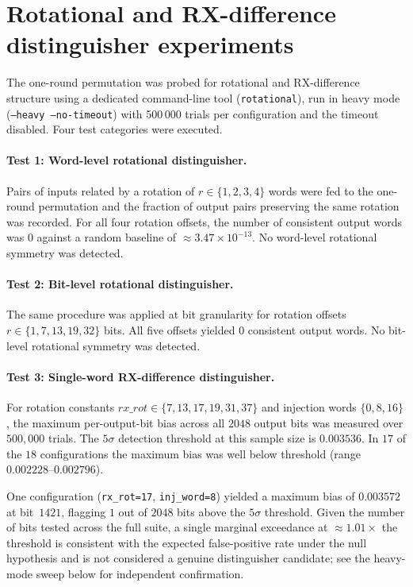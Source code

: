 \documentclass[11pt,a4paper]{article}
\begin{document}
\section{Rotational and RX-difference distinguisher experiments}
\label{sec:rotational}

The one-round permutation was probed for rotational and RX-difference structure
using a dedicated command-line tool (\texttt{rotational}), run in heavy mode
(\texttt{--heavy --no-timeout}) with 500\,000 trials per configuration and the
timeout disabled.  Four test categories were executed.

\paragraph{Test 1: Word-level rotational distinguisher.}
Pairs of inputs related by a rotation of $r \in \{1,2,3,4\}$ words were fed to
the one-round permutation and the fraction of output pairs preserving the same
rotation was recorded.  For all four rotation offsets, the number of consistent
output words was $0$ against a random baseline of ${\approx}3.47\times10^{-13}$.
No word-level rotational symmetry was detected.

\paragraph{Test 2: Bit-level rotational distinguisher.}
The same procedure was applied at bit granularity for rotation offsets
$r \in \{1, 7, 13, 19, 32\}$ bits.  All five offsets yielded $0$ consistent
output words.  No bit-level rotational symmetry was detected.

\paragraph{Test 3: Single-word RX-difference distinguisher.}
For rotation constants $\mathit{rx\_rot} \in \{7, 13, 17, 19, 31, 37\}$ and
injection words $\{0, 8, 16\}$, the maximum per-output-bit bias across all $2048$
output bits was measured over $500{,}000$ trials.  The $5\sigma$ detection
threshold at this sample size is $0.003536$.  In $17$ of the $18$ configurations
the maximum bias was well below threshold (range $0.002228$--$0.002796$).

One configuration (\texttt{rx\_rot=17}, \texttt{inj\_word=8}) yielded a maximum
bias of $0.003572$ at bit~$1421$, flagging $1$ out of $2048$ bits above the
$5\sigma$ threshold.  Given the number of bits tested across the full suite, a
single marginal exceedance at ${\approx}1.01\times$ the threshold is consistent
with the expected false-positive rate under the null hypothesis and is not
considered a genuine distinguisher candidate; see the heavy-mode sweep below for
independent confirmation.
\end{document}
